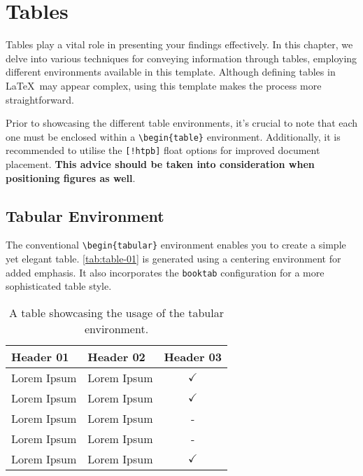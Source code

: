 \chapter{Tables}
Tables play a vital role in presenting your findings effectively. In this chapter, we delve into various techniques for conveying information through tables, employing different environments available in this template. Although defining tables in \LaTeX\ may appear complex, using this template makes the process more straightforward.

\begin{importantbox}
    Prior to showcasing the different table environments, it's crucial to note that each one must be enclosed within a \verb|\begin{table}| environment. Additionally, it is recommended to utilise the \verb|[!htpb]| float options for improved document placement. \textbf{This advice should be taken into consideration when positioning figures as well}.
\end{importantbox}

\section{Tabular Environment}
The conventional \verb|\begin{tabular}| environment enables you to create a simple yet elegant table. \autoref{tab:table-01} is generated using a centering environment for added emphasis. It also incorporates the \verb|booktab| configuration for a more sophisticated table style.

\begin{table}[!htpb]
    \caption{A table showcasing the usage of the tabular environment.}
    \label{tab:table-01}
    \centering
    \begin{tabular}{llc}
        \toprule
        \textbf{Header 01} & \textbf{Header 02} & \textbf{Header 03} \\ 
        \midrule
        Lorem Ipsum & Lorem Ipsum & $\checkmark$ \\
        Lorem Ipsum & Lorem Ipsum & $\checkmark$ \\
        Lorem Ipsum & Lorem Ipsum & - \\
        Lorem Ipsum & Lorem Ipsum & - \\
        Lorem Ipsum & Lorem Ipsum & $\checkmark$ \\
        \bottomrule
    \end{tabular}
\end{table}

